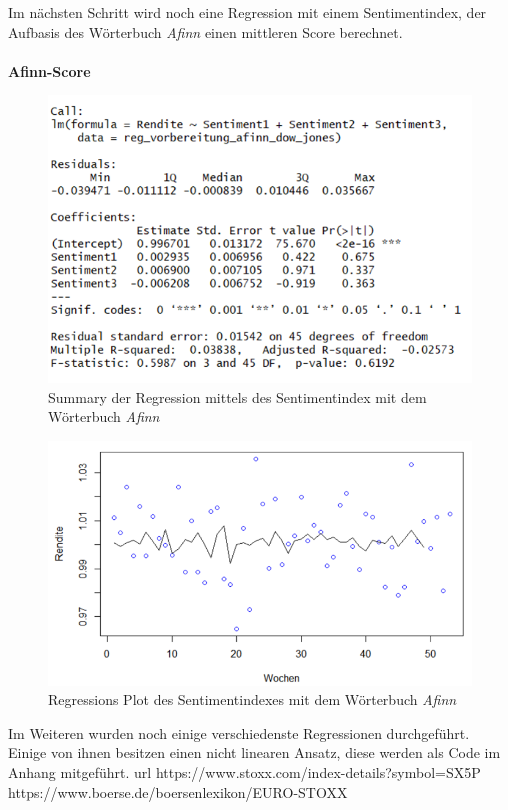 Im nächsten Schritt wird noch eine Regression mit einem Sentimentindex, der Aufbasis des Wörterbuch \textit{Afinn} einen mittleren Score berechnet. \\
\\
\textbf{Afinn-Score}
 \begin{figure}[H]
	\centering
	\includegraphics[width=1\textwidth]{Pictures/afinn_summary.png}
	\caption{Summary der Regression mittels des Sentimentindex mit dem Wörterbuch \textit{Afinn} }
	\label{Afinn_summary}
\end{figure} 
\begin{figure}[H]
	\centering
	\includegraphics[width=1\textwidth]{Pictures/Afinn_plot.png}
	\caption{Regressions Plot des Sentimentindexes mit dem Wörterbuch \textit{Afinn} }
	\label{Afinn_plot_regression}
\end{figure} 
Im Weiteren wurden noch einige verschiedenste Regressionen durchgeführt. Einige von ihnen besitzen einen nicht linearen Ansatz, diese werden als Code im Anhang mitgeführt.  
url https://www.stoxx.com/index-details?symbol=SX5P
https://www.boerse.de/boersenlexikon/EURO-STOXX
